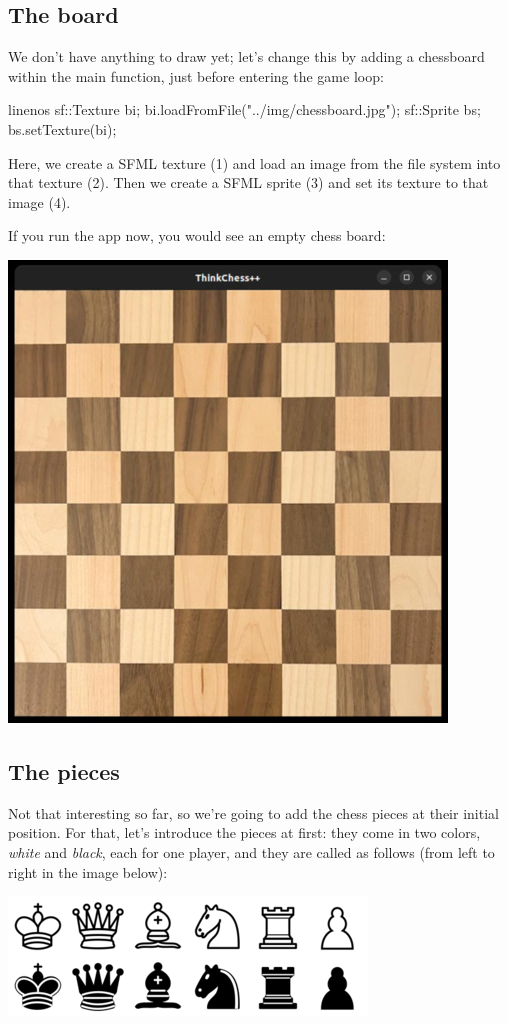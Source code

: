 \subsection{The board}
We don't have anything to draw yet; let's change this by adding a chessboard
within the main function, just before entering the game loop:

\begin{cpp*}{linenos}
  sf::Texture bi;
  bi.loadFromFile("../img/chessboard.jpg");
  sf::Sprite bs;
  bs.setTexture(bi);
\end{cpp*}

Here, we create a SFML texture (1) and load an image from the file system into that texture (2).
Then we create a SFML sprite (3) and set its texture  to that image (4).

If you run the app now, you would see an empty chess board:

\begin{center}
\includegraphics[width=.5\linewidth]{img/emptyBoard.jpg}
\end{center}

\subsection{The pieces}\label{subsec:pieces}
Not that interesting so far, so we're going to add the chess pieces at their initial position.
For that, let's introduce the pieces at first: they come in two colors, \emph{white}
and \emph{black}, each for one player, and they are called as follows
(from left to right in the image below):

\begin{center}
\includegraphics[width=.5\linewidth]{../img/figures.png}
\end{center}

